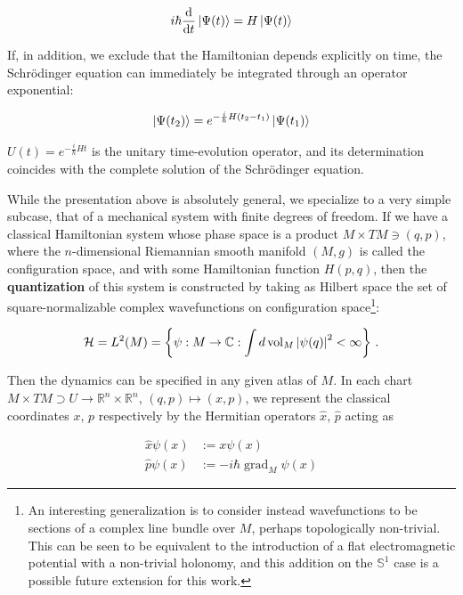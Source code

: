 \documentclass{article}
\newcommand{\hil}{\ensuremath{\mathcal{H}}}
\begin{document}
\begin{equation}
    i \hbar \dv{t}\ket{\Psi(t)} = H \ket{\Psi(t)}
\end{equation}


If, in addition, we exclude that the Hamiltonian depends explicitly on time, the Schr\"odinger equation can immediately be integrated through an operator exponential:

\begin{equation}
    \ket{\Psi(t_2)} = e^{-\frac{i}{\hbar} H (t_2-t_1)} \ket{\Psi(t_1)} 
\end{equation}

$U(t) = e^{-\frac{i}{\hbar} H t}$ is the unitary time-evolution operator, and its determination coincides with the complete solution of the Schr\"odinger equation.

While the presentation above is absolutely general, we specialize to a very simple subcase, that of a mechanical system with finite degrees of freedom. If we have a classical Hamiltonian system whose phase space is a product $M \times TM \ni (q,p)$, where the $n$-dimensional Riemannian smooth manifold $(M,g)$ is called the configuration space, and with some Hamiltonian function $H(p,q)$, then the \textbf{quantization} of this system is constructed by taking as Hilbert space the set of square-normalizable complex wavefunctions on configuration space\footnote{An interesting generalization is to consider instead wavefunctions to be sections of a complex line bundle over $M$, perhaps topologically non-trivial. This can be seen to be equivalent to the introduction of a flat electromagnetic potential with a non-trivial holonomy, and this addition on the $\mathbb{S}^1$ case is a possible future extension for this work.}:

\begin{equation}
    \hil = L^2(M) = \left\{ \psi : M \rightarrow \mathbb{C} : \int d\operatorname{vol}_M \abs{\psi(q)}^2 < \infty \right\}\,.
\end{equation}

Then the dynamics can be specified in any given atlas of $M$. In each chart $M \times TM \supset U \rightarrow \mathbb{R}^n \times \mathbb{R}^n$, $(q,p) \mapsto (x,p)$, we represent the classical coordinates $x$, $p$ respectively by the Hermitian operators $\hat x$, $\hat p$ acting as

\begin{align}
    \hat x \psi(x) & := x \psi(x)\\
    \hat p \psi(x) & := -i \hbar \operatorname{grad}_M \psi(x)
\end{align}
\end{document}
